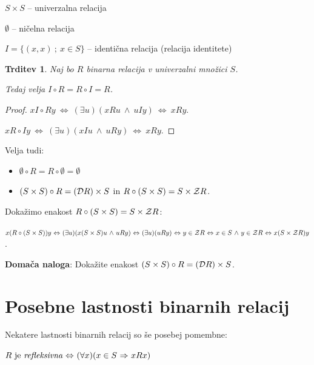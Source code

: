 \documentclass[11pt,paper=b5,footinclude,headinclude]{scrbook} %
\def\inn {{~\wedge~}}
\def\sledi {{~\Rightarrow~}}
\def\cee {{~\Leftrightarrow~}}
\newtheorem*{trditev}{Trditev}
\begin{document}
$S\times S$ -- univerzalna relacija

$\emptyset$ -- ničelna relacija

$I = \{(x,x)~;~x\in S\}$ -- identična relacija (relacija identitete)

\begin{trditev}
Naj bo $R$ binarna relacija v univerzalni množici $S$.

Tedaj velja $I\circ R = R\circ I = R$.
\end{trditev}

\begin{proof}
$xI\circ Ry \cee (\exists u)(xRu \inn uIy) \cee xRy$.

$xR\circ Iy \cee (\exists u)(xIu \inn uRy) \cee xRy$.
\end{proof}

\medskip
Velja tudi:

\begin{itemize}
  \item $\emptyset \circ R = R\circ \emptyset = \emptyset$
  \item $(S\times S)\circ R =
({\cal D}R) \times S$ in $R\circ (S\times S) = S\times {\cal Z}R$.
\end{itemize}

Dokažimo enakost $R\circ (S\times S) = S\times {\cal Z}R$:

$x(R\circ (S\times S))y \cee (\exists u)(x(S\times S)u \inn uRy)
\cee (\exists u)(uRy) \cee y\in {\cal Z}R \cee x\in S\inn y\in {\cal Z}R  \cee x(S\times {\cal Z}R)y$.

\bigskip

\textbf{ Domača naloga}: Dokažite enakost
$(S\times S)\circ R = ({\cal D}R) \times S$.


\section{Posebne lastnosti binarnih relacij}

Nekatere lastnosti binarnih relacij so še posebej pomembne:

\bigskip

$R \textrm{ je {\em refleksivna}} \cee (\forall x)(x\in S\sledi xRx)$

\end{document}
